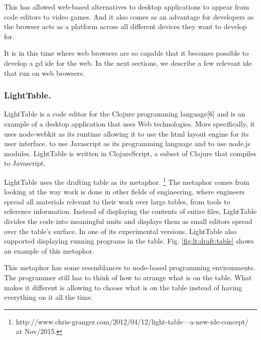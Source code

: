 \documentclass{./llncs2e/llncs}
\begin{document}
	This has allowed web-based alternatives to desktop applications to appear from code editors to video games.
	And it also comes as an advantage for developers as the browser acts as a platform across all different devices they want to develop for.
	
	It is in this time where web browsers are so capable that it becomes possible to develop a \ac{gd} \ac{ide} for the web.
	In the next sections, we describe a few relevant \ac{ide} that run on web browsers.

\subsubsection{LightTable.}
	LightTable\cite{lighttable2015site} is a code editor for the Clojure programming language[6] and is an example of a desktop application that uses Web technologies.
	More specifically, it uses node-webkit as its runtime allowing it to use the html layout engine for its user interface, to use Javascript as its programming language and to use node.js\cite{tilkov2010node} modules.
	LightTable is written in ClojureScript\cite{10.1109/MIC.2011.148}, a subset of Clojure that compiles to Javascript.


	LightTable uses the drafting table as its metaphor.
	\footnote{http://www.chris-granger.com/2012/04/12/light-table---a-new-ide-concept/ at Nov/2015.}
	The metaphor comes from looking at the way work is done in other fields of engineering, where engineers spread all materials relevant to their work over large tables, from tools to reference information. 
	Instead of displaying the contents of entire files, LightTable divides the code into meaningful units and displays them as small editors spread over the table's surface. 
	In one of its experimental versions, LightTable also supported displaying running programs in the table. 
	Fig. \ref{fig:lt:draft:table} shows an example of this metaphor.

	This metaphor has some resemblances to node-based programming environments. 
	The programmer still has to think of how to arrange what is on the table.
	What makes it different is allowing to choose what is on the table instead of having everything on it all the time.
\end{document}
